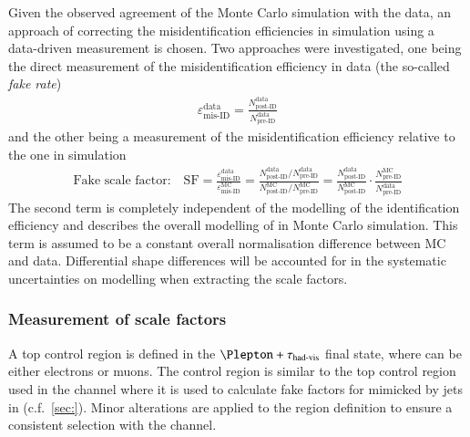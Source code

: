 Given the observed agreement of the Monte Carlo simulation with the
data, an approach of correcting the misidentification efficiencies in
simulation using a data-driven measurement is chosen. Two approaches
were investigated, one being the direct measurement of the
misidentification efficiency in data (the so-called \textit{fake
  rate})
\begin{align*}
  \varepsilon_\text{mis-ID}^\text{data} = \frac{N_\text{post-ID}^\text{data}}{N_\text{pre-ID}^\text{data}}
\end{align*}
and the other being a measurement of the misidentification efficiency
relative to the one in simulation
\begin{align*}
  \text{Fake scale factor:}\quad
  \text{SF} =
  \frac{\varepsilon_\text{mis-ID}^\text{data}}{\varepsilon_\text{mis-ID}^\text{MC}} =
  \frac{N_\text{post-ID}^\text{data} / N_\text{pre-ID}^\text{data}}{N_\text{post-ID}^\text{MC} / N_\text{pre-ID}^\text{MC}}
  = \frac{N_\text{post-ID}^\text{data}}{N_\text{post-ID}^\text{MC}} \cdot \frac{N_\text{pre-ID}^\text{MC}}{N_\text{pre-ID}^\text{data}}
\end{align*}
The second term is completely independent of the modelling of the
\tauhadvis identification efficiency and describes the overall
modelling of \ttbar in Monte Carlo simulation. This term is assumed to
be a constant overall normalisation difference between MC and
data. Differential shape differences will be accounted for in the
systematic uncertainties on \ttbar modelling when extracting the scale
factors.




\subsubsection{Measurement of scale factors}

A top control region is defined in the $\Plepton + \tauhadvis$ final
state, where \Plepton can be either electrons or muons. The control
region is similar to the top control region used in the \lephad
channel where it is used to calculate fake factors for \tauhadvis
mimicked by jets in \ttbar (c.f.\ \cref{sec:}). Minor alterations are
applied to the region definition to ensure a consistent \tauhadvis
selection with the \hadhad channel.

